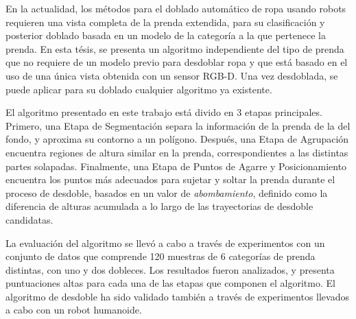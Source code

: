 En la actualidad, los métodos para el doblado automático de ropa usando robots requieren una vista completa de la prenda extendida, para su clasificación y posterior doblado basada en un modelo de la categoría a la que pertenece la prenda. En esta tésis, se presenta un algoritmo independiente del tipo de prenda que no requiere de un modelo previo para desdoblar ropa y que está basado en el uso de una única vista obtenida con un sensor RGB-D. Una vez desdoblada, se puede aplicar para su doblado cualquier algoritmo ya existente.

El algoritmo presentado en este trabajo está divido en 3 etapas principales. Primero, una Etapa de Segmentación separa la información de la prenda de la del fondo, y aproxima su contorno a un polígono. Después, una Etapa de Agrupación encuentra regiones de altura similar en la prenda, correspondientes a las distintas partes solapadas. Finalmente, una Etapa de Puntos de Agarre y Posicionamiento encuentra los puntos más adecuados para sujetar y soltar la prenda durante el proceso de desdoble, basados en un valor de \textit{abombamiento}, definido como la diferencia de alturas acumulada a lo largo de las trayectorias de desdoble candidatas.

La evaluación del algoritmo se llevó a cabo a través de experimentos con un conjunto de datos que comprende 120 muestras de 6 categorías de prenda distintas, con uno y dos dobleces. Los resultados fueron analizados, y presenta puntuaciones altas para cada una de las etapas que componen el algoritmo. El algoritmo de desdoble ha sido validado también a través de experimentos llevados a cabo con un robot humanoide.
